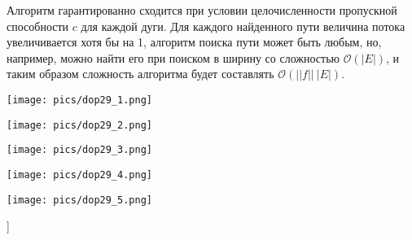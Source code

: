 Алгоритм гарантированно сходится при условии целочисленности пропускной способности $c$ для каждой дуги. Для каждого найденного пути величина потока увеличивается хотя бы на 1, алгоритм поиска пути может быть любым, но, например, можно найти его при поиском в ширину со сложностью $\mathcal{O}(|E|)$, и таким образом сложность алгоритма будет составлять $\mathcal{O}(||f||~|E|)$.

\texttt{[image: pics/dop29\_1.png]}

\texttt{[image: pics/dop29\_2.png]}

\texttt{[image: pics/dop29\_3.png]}

\texttt{[image: pics/dop29\_4.png]}

\texttt{[image: pics/dop29\_5.png]}

\bigbreak
[\cite[page 69-96]{replace_me}]

